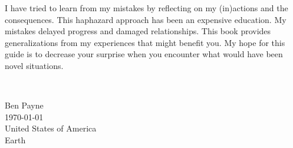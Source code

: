 I have tried to learn from my mistakes by reflecting on my (in)actions and the consequences. This haphazard approach has been an expensive education. My mistakes delayed progress and damaged relationships. This book provides generalizations from my experiences that might benefit you. My hope for this guide is to decrease your surprise when you encounter what would have been novel situations.



\ \\

\begin{flushright}
Ben Payne\\
\today\\
United States of America\\
Earth
\end{flushright}


